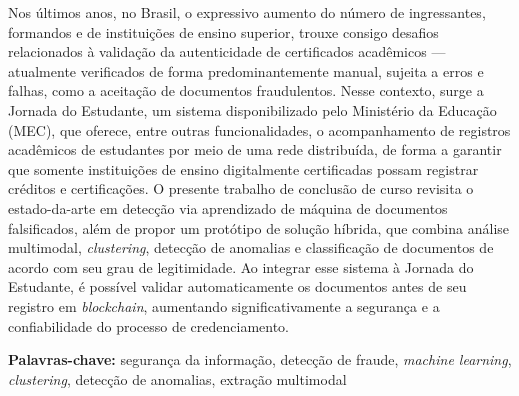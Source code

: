 \begin{resumo}
    Nos últimos anos, no Brasil, o expressivo aumento do número de ingressantes, formandos e de instituições de ensino superior, trouxe consigo desafios relacionados à validação da autenticidade de certificados acadêmicos — atualmente verificados de forma predominantemente manual, sujeita a erros e falhas, como a aceitação de documentos fraudulentos.
    Nesse contexto, surge a Jornada do Estudante, um sistema disponibilizado pelo Ministério da Educação (MEC), que oferece, entre outras funcionalidades, o acompanhamento de registros acadêmicos de estudantes por meio de uma rede distribuída, de forma a garantir que somente instituições de ensino digitalmente certificadas possam registrar créditos e certificações.
    O presente trabalho de conclusão de curso revisita o estado-da-arte em detecção via aprendizado de máquina de documentos falsificados, além de propor um protótipo de solução híbrida, que combina análise multimodal, \textit{clustering}, detecção de anomalias e classificação de documentos de acordo com seu grau de legitimidade.
    Ao integrar esse sistema à Jornada do Estudante, é possível validar automaticamente os documentos antes de seu registro em \textit{blockchain}, aumentando significativamente a segurança e a confiabilidade do processo de credenciamento.

  

    \textbf{Palavras-chave:} segurança da informação, detecção de fraude, \textit{machine learning}, \textit{clustering}, detecção de anomalias, extração multimodal
\end{resumo}

